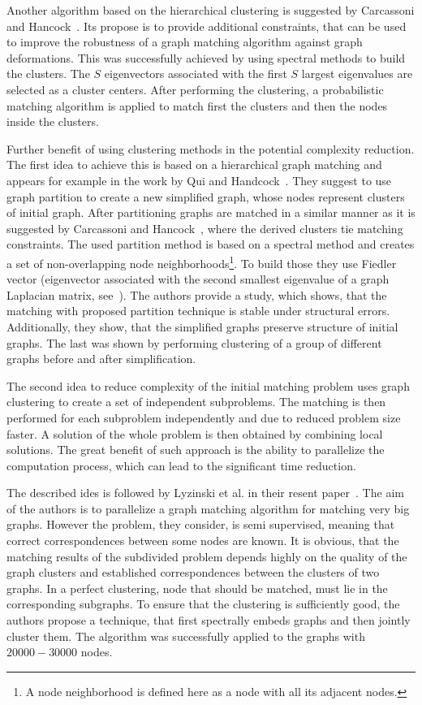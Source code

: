 Another algorithm based on the hierarchical clustering is suggested by Carcassoni and Hancock~\cite{Hancock_ModalClusters}. Its propose is to provide additional constraints, that can be used to improve the robustness of a graph matching algorithm against graph deformations. This was successfully achieved by using spectral methods to build the clusters. The $S$ eigenvectors associated with the first $S$ largest eigenvalues are selected as a cluster centers. After performing the clustering, a probabilistic matching algorithm is applied to match first the clusters and then the nodes inside the clusters.

Further benefit of using clustering methods in the potential complexity reduction. 
The first idea to achieve this is based on a hierarchical graph matching and appears for example in the work by Qui and Handcock~\cite{Hancock_GM_SpectralPart}. They suggest to use graph partition to create a new simplified graph, whose nodes represent clusters of initial graph. After partitioning graphs are matched in a similar manner as it is suggested by Carcassoni and Hancock~\cite{Hancock_ModalClusters}, where the derived clusters tie matching constraints. The used partition method is based on a spectral method and creates a set of non-overlapping node neighborhoods\footnote{A node neighborhood is defined here as a node with all its adjacent nodes.}. To build those they use Fiedler vector (eigenvector associated with the second smallest eigenvalue of a graph Laplacian matrix, see~\cite{Fiedler1975}). The authors provide a study, which shows, that the matching with proposed partition technique is stable under structural errors. Additionally, they show, that the simplified graphs preserve structure of initial graphs. The last was shown by performing clustering of a group of different graphs before and after simplification.

The second idea to reduce complexity of the initial matching problem uses graph clustering to create a set of independent subproblems. The matching is then performed for each subproblem independently and due to reduced problem size faster. A solution of the whole problem is then obtained by combining local solutions. The great benefit of such approach is the ability to parallelize the computation process, which can lead to the significant time reduction.

The described ides is followed by Lyzinski et al. in their resent paper~\cite{Lyzinski2015}. The aim of the authors is to parallelize a graph matching algorithm for matching very big graphs. However the problem, they consider, is semi supervised, meaning that correct correspondences between some nodes are known. It is obvious, that the matching results of the subdivided problem depends highly on the quality of the graph clusters and established correspondences between the clusters of two graphs. In a perfect clustering, node that should be matched, must lie in the corresponding subgraphs. To ensure that the clustering is sufficiently good, the authors propose a technique, that first spectrally embeds graphs and then jointly cluster them. The algorithm was successfully applied to the graphs with $20000-30000$ nodes.

